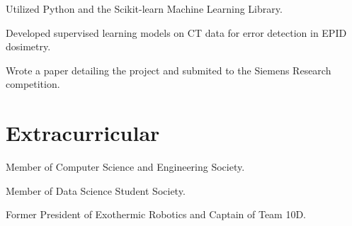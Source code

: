 \documentclass[]{deedy-resume-openfont}
\begin{document}
\begin{minipage}[t]{0.66\textwidth}
\begin{tightemize}
\item Utilized Python and the Scikit-learn Machine Learning Library.
\item Developed supervised learning models on CT data for error detection in EPID dosimetry.
\item Wrote a paper detailing the project and submited to the Siemens Research competition.
\end{tightemize}
\sectionsep

\vspace{3mm}

\section{Extracurricular} 
\vspace{2mm}
\begin{tightemize}
\item Member of Computer Science and Engineering Society.
\item Member of Data Science Student Society.
\item Former President of Exothermic Robotics and Captain of Team 10D.
\end{tightemize}
\sectionsep

\end{minipage} 
\end{document}
